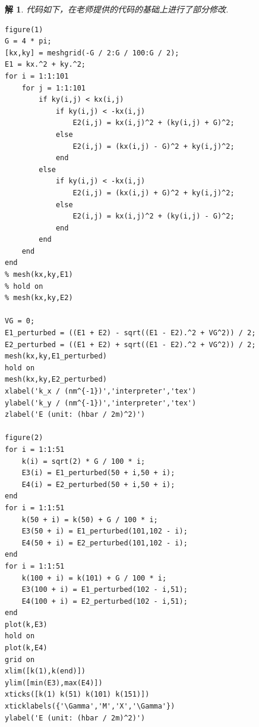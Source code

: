 \documentclass[UTF8,10pt,a4paper]{article}
\theoremstyle{Problem}
\theoremstyle{Solution}
\newtheorem*{sol}{解}
\begin{document}
\begin{sol}
    代码如下，在老师提供的代码的基础上进行了部分修改.
\begin{lstlisting}
figure(1)
G = 4 * pi;
[kx,ky] = meshgrid(-G / 2:G / 100:G / 2);
E1 = kx.^2 + ky.^2;
for i = 1:1:101
    for j = 1:1:101
        if ky(i,j) < kx(i,j)
            if ky(i,j) < -kx(i,j)
                E2(i,j) = kx(i,j)^2 + (ky(i,j) + G)^2;
            else
                E2(i,j) = (kx(i,j) - G)^2 + ky(i,j)^2;
            end
        else
            if ky(i,j) < -kx(i,j)
                E2(i,j) = (kx(i,j) + G)^2 + ky(i,j)^2;
            else
                E2(i,j) = kx(i,j)^2 + (ky(i,j) - G)^2;
            end
        end
    end
end
% mesh(kx,ky,E1)
% hold on
% mesh(kx,ky,E2)

VG = 0;
E1_perturbed = ((E1 + E2) - sqrt((E1 - E2).^2 + VG^2)) / 2;
E2_perturbed = ((E1 + E2) + sqrt((E1 - E2).^2 + VG^2)) / 2;
mesh(kx,ky,E1_perturbed)
hold on
mesh(kx,ky,E2_perturbed)
xlabel('k_x / (nm^{-1})','interpreter','tex')
ylabel('k_y / (nm^{-1})','interpreter','tex')
zlabel('E (unit: (hbar / 2m)^2)')

figure(2)
for i = 1:1:51
    k(i) = sqrt(2) * G / 100 * i;
    E3(i) = E1_perturbed(50 + i,50 + i);
    E4(i) = E2_perturbed(50 + i,50 + i);
end
for i = 1:1:51
    k(50 + i) = k(50) + G / 100 * i;
    E3(50 + i) = E1_perturbed(101,102 - i);
    E4(50 + i) = E2_perturbed(101,102 - i);
end
for i = 1:1:51
    k(100 + i) = k(101) + G / 100 * i;
    E3(100 + i) = E1_perturbed(102 - i,51);
    E4(100 + i) = E2_perturbed(102 - i,51);
end
plot(k,E3)
hold on
plot(k,E4)
grid on
xlim([k(1),k(end)])
ylim([min(E3),max(E4)])
xticks([k(1) k(51) k(101) k(151)])
xticklabels({'\Gamma','M','X','\Gamma'})
ylabel('E (unit: (hbar / 2m)^2)')
\end{lstlisting}
\end{sol}
\end{document}
